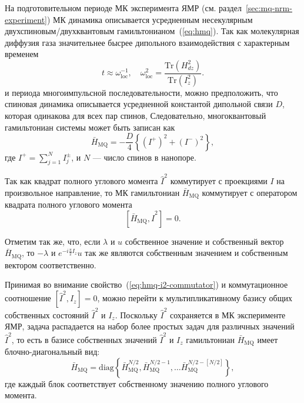 На подготовительном периоде МК эксперимента ЯМР (см. раздел~\ref{sec:mq-nrm-experiment})
МК динамика описывается усредненным несекулярным двухспиновым/двухквантовым гамильтонианом~(\ref{eq:hmq}).
Так как молекулярная диффузия газа значительнее бысрее дипольного взаимодействия с характерным временем~\cite{Feldman2012}
%
\begin{equation}
  t \approx \omega^{-1}_\mathrm{loc},
  \quad
  \omega^2_\mathrm{loc} = \frac{\mathrm{Tr}(H^2_{dz})}{\mathrm{Tr}(I^2_z)}.
\end{equation}
%
и периода многоимпульсной последовательности,
можно предположить,
что спиновая динамика описывается усредненной константой дипольной связи $D$,
которая одинакова для всех пар спинов,
Следовательно, многоквантовый гамильтониан системы может быть записан как
\begin{equation}\label{eq:mq-hamiltoninan-equivalent-spins}
  \bar H_\mathrm{MQ} = - \dfrac{D}{4} \left\{
      \left( I^{+} \right)^2 + \left( I^{-} \right)^2
  \right\},
\end{equation}
где $I^{+} = \sum\limits_{j=1}^{N} I^{\pm}_j$,
и $N$ --- число спинов в нанопоре.

Так как квадрат полного углового момента $\hat I^2$ коммутирует с
проекциями $I$ на произвольное направление,
то МК гамильтониан $\bar H_\mathrm{MQ}$ коммутирует с оператором квадрата полного углового момента
\begin{equation}\label{eq:hmq-i2-commutator}
  \left[ \bar H_\mathrm{MQ}, \hat I^2 \right] = 0.
\end{equation}

Отметим так же,
что, если $\lambda$ и $u$ собственное значение и собственный вектор  $\bar H_\mathrm{MQ}$,
то $-\lambda$ и $e^{-i\frac{\pi}{2}I_z}u$
так же являются собственным значением и собственным вектором соответственно.

Принимая во внимание свойство~(\ref{eq:hmq-i2-commutator}) и коммутационное соотношение ${[\hat I^2, I_z] = 0}$,
можно перейти к мультипликативному базису общих собственных состояний $\hat I^2$ и $I_z$.
Поскольку $\hat I^2$ сохраняется в МК эксперименте ЯМР,
задача распадается на набор более простых задач для различных значений $\hat I^2$,
то есть в базисе собственных значений  $\hat I^2$ и $I_z$
гамильтониан $\bar H_\mathrm{MQ}$ имеет блочно-диагональный вид:
\begin{equation}
  \bar H_\mathrm{MQ} = \mathrm{diag} \left\{
    \bar H_\mathrm{MQ}^{N/2},
    \bar H_\mathrm{MQ}^{N/2 - 1},
    \dots
    \bar H_\mathrm{MQ}^{N/2 - [N/2]}
  \right\},
\end{equation}
где каждый блок соответствует собственному значению полного углового момента.

